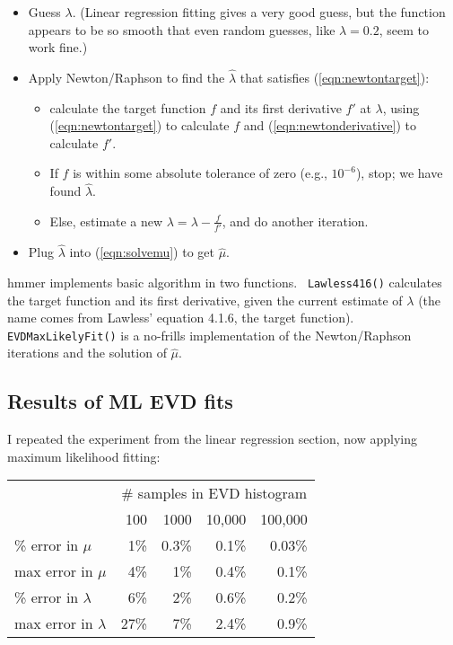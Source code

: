 \begin{itemize}
\item Guess $\lambda$. (Linear regression fitting gives a very good
      guess, but the function appears to be so smooth that even
      random guesses, like $\lambda = 0.2$, seem to work fine.)
\item Apply Newton/Raphson to find the $\hat{\lambda}$ that satisfies
      (\ref{eqn:newtontarget}):
	\begin{itemize}
	\item calculate the target function $f$ and 
         its first derivative $f'$ at $\lambda$, using 
	(\ref{eqn:newtontarget}) to calculate $f$ and 
	(\ref{eqn:newtonderivative}) to calculate $f'$.
	\item If $f$ is within some absolute tolerance of zero 
	(e.g., $10^{-6}$), stop; we have found $\hat{\lambda}$.
	\item Else, estimate a new $\lambda = \lambda - \frac{f}{f'}$,
	  and do another iteration.
	\end{itemize}
\item Plug $\hat{\lambda}$ into (\ref{eqn:solvemu}) to get $\hat{\mu}$.
\end{itemize}

{\sc hmmer} implements basic algorithm in two functions.  {\tt
Lawless416()} calculates the target function and its first derivative,
given the current estimate of $\lambda$ (the name comes from Lawless'
equation 4.1.6, the target function). {\tt EVDMaxLikelyFit()} is a
no-frills implementation of the Newton/Raphson iterations and the
solution of $\hat{\mu}$.

\subsection{Results of ML EVD fits}

I repeated the experiment from the linear regression section, now
applying maximum likelihood fitting:

\begin{center}
\begin{tabular}{lrrrr} \hline
 & \multicolumn{4}{c}{\# samples in EVD histogram}\\
                        & 100 & 1000  & 10,000 & 100,000 \\
\% error in $\mu$       &  1\%& 0.3\% &  0.1\% & 0.03\%  \\
max error in $\mu$      &  4\%&   1\% &  0.4\% &  0.1\%  \\
\% error in $\lambda$   &  6\%&   2\% &  0.6\% &  0.2\%  \\
max error in $\lambda$  & 27\%&   7\% &  2.4\% &  0.9\%  \\ \hline
\end{tabular}
\end{center}

